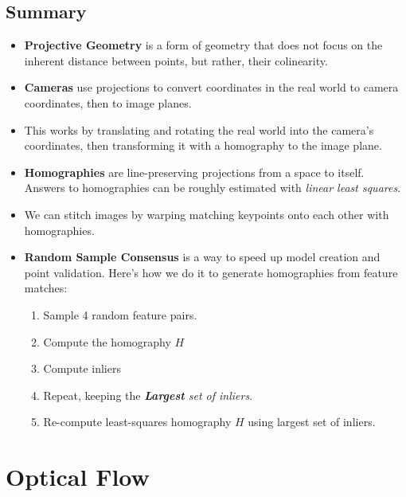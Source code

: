 \documentclass{article}
\begin{document}
\subsection{Summary}
\begin{itemize}
    \item \textbf{Projective Geometry} is a form of geometry that does not focus on the inherent distance between points, but rather, their colinearity.
    \item \textbf{Cameras} use projections to convert coordinates in the real world to camera coordinates, then to image planes.
    \item This works by translating and rotating the real world into the camera's coordinates, then transforming it with a homography to the image plane. 
    \item \textbf{Homographies} are line-preserving projections from a space to itself. Answers to homographies can be roughly estimated with \textit{linear least squares}.
    \item We can stitch images by warping matching keypoints onto each other with homographies.
    \item \textbf{Random Sample Consensus} is a way to speed up model creation and point validation. Here's how we do it to generate homographies from feature matches:
    \begin{enumerate}
        \item Sample 4 random feature pairs.
        \item Compute the homography $H$
        \item Compute inliers
        \item Repeat, keeping the \textit{\textbf{Largest} set of inliers}.
        \item Re-compute least-squares homography $H$ using largest set of inliers.
    \end{enumerate}
\end{itemize}
\section{Optical Flow}
\end{document}
